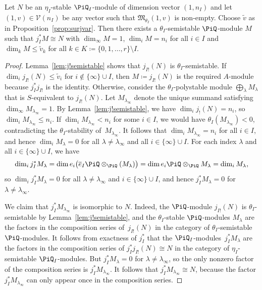  \begin{Lemma} \label{lem:existsemistable} Let $N$ be an $\eta_I$-stable $\PiQ_I$-module of dimension vector $(1,n_I)$ and let $(1,v) \in \mathcal{V}(n_I)$ be any vector such that $\mathfrak{M}_{\theta_I}(1,v)$ is non-empty. Choose
$\widetilde{v}$ as in Proposition~{\rm \ref{prop:surjvar}}. Then there exists a $\theta_I$-semistable $\PiQ$-module $M$ such that $j_I^*M \cong N$ with $\dim_{\infty} M =1$, $\dim_i M = n_i$ for all $i\in I$ and $\dim_k M \leq \widetilde{v}_k$ for all $k\in K\coloneqq\{0,1,\dots,r\}\setminus I$.
 \end{Lemma}

\begin{proof} Lemma~\ref{lem:j!semistable} shows that $j_{I!}(N)$ is $\theta_I$-semistable. If $\dim_i j_{I!}(N) \leq \widetilde{v}_i$ for $i\not\in \{\infty\}\cup I$, then
 $M\coloneqq j_{I!}(N)$ is the required $A$-module because $j_I^*j_{I!}$ is the identity. Otherwise, consider the $\theta_I$-polystable module $\bigoplus_{\lambda} M_\lambda$ that is $S$-equivalent to $j_{I!}(N)$. Let $M_{\lambda_\infty}$ denote the unique summand satisfying $\dim_\infty M_{\lambda_\infty} =1$. By Lemma~\ref{lem:j!semistable}, we have $\dim_i j_!(N) = n_i$, so $\dim_i M_{\lambda_\infty} \le n_i$.
 If $\dim_i M_{\lambda_\infty}<n_i$ for some $i\in I$, we would have $\theta_I(M_{\lambda_\infty})<0$, contradicting the
 $\theta_I$-stability of~$M_{\lambda_\infty}$. It follows that $\dim_i M_{\lambda_\infty} =n_i$ for all $i\in I$, and hence $\dim_i M_\lambda =0$ for all $\lambda\neq {\lambda_\infty}$ and all $i\in \{\infty\}\cup I$. For each index $\lambda$ and all $i\in \{\infty\}\cup I$, we have
\[
\dim_i j_I^*M_\lambda = \dim e_i \big(\overline{e}_I\PiQ\otimes_{\PiQ}(M_\lambda)\big) = \dim e_i \PiQ\otimes_{\PiQ} M_\lambda = \dim_i M_\lambda,
\]
 so $\dim_i j_I^*M_\lambda = 0$ for all
 $\lambda\neq {\lambda_\infty}$ and $i\in \{\infty\}\cup I$, and hence
 $j_I^*M_\lambda=0$ for $\lambda\neq {\lambda_\infty}$.

 We claim that $j_I^*M_{\lambda_\infty}$ is isomorphic to $N$. Indeed, the $\PiQ$-module $j_{I!}(N)$ is $\theta_I$-semistable by Lemma~\ref{lem:j!semistable}, and the $\theta_I$-stable $\PiQ$-modules $M_\lambda$ are
 the factors in the composition series of~$j_{I!}(N)$ in the category of $\theta_I$-semistable $\PiQ$-modules. It follows from exactness of $j_I^*$ that the $\PiQ_I$-modules~$j_I^*M_\lambda$ are the factors in the composition series of $j_I^*j_{I!}(N)\cong N$ in the category of $\eta_I$-semistable $\PiQ_I$-modules. But $j_I^*M_\lambda=0$ for $\lambda\neq {\lambda_\infty}$, so the only nonzero factor of the composition series is $j_I^*M_{\lambda_\infty}$. It follows that $j_I^*M_{\lambda_\infty}\cong N$, because the factor $j_I^*M_{\lambda_\infty}$ can only appear once in the composition series.


\end{proof}

